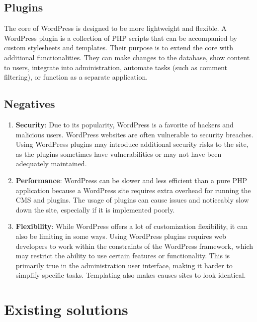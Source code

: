 \documentclass[
  digital,     %
  oneside,     %
  nosansbold,  %
  colorbold, %
  lof,         %
  lot,         %
]{fithesis4}
\begin{document}
\subsection{Plugins}

The core of WordPress is designed to be more lightweight and flexible. A WordPress
plugin is a collection of PHP scripts that can be accompanied by custom stylesheets
and templates. Their purpose is to extend the core with additional functionalities.
They can make changes to the database, show content to users, integrate into
administration, automate tasks (such as comment filtering), or function as
a separate application.

\subsection{Negatives}

\begin{enumerate}
	
	\item \textbf{Security}: Due to its popularity, WordPress is a favorite of hackers
and malicious users. WordPress websites are often vulnerable to security breaches.
Using WordPress plugins may introduce additional security risks to the site, as the
plugins sometimes have vulnerabilities or may not have been adequately maintained.
	
	\item \textbf{Performance}: WordPress can be slower and less efficient than a pure
PHP application because a WordPress site requires extra overhead for running the CMS
and plugins. The usage of plugins can cause issues and noticeably slow down the site,
especially if it is implemented poorly.
	
	\item \textbf{Flexibility}: While WordPress offers a lot of customization flexibility,
it can also be limiting in some ways. Using WordPress plugins requires web developers
to work within the constraints of the WordPress framework, which may restrict the
ability to use certain features or functionality. This is primarily true in the administration
user interface, making it harder to simplify specific tasks. Templating also makes causes
sites to look identical.
\end{enumerate}

\section{Existing solutions}
\end{document}
